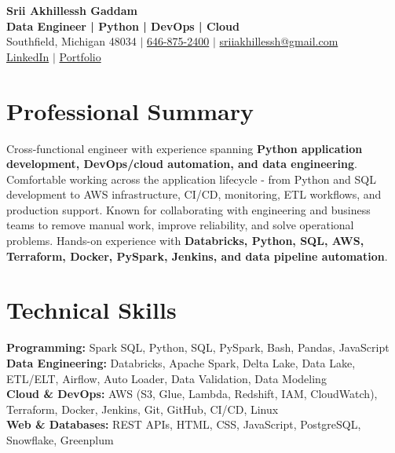 \documentclass[letterpaper,10pt]{article}
\begin{document}
\fontsize{9.35pt}{10.45pt}\selectfont

\begin{center}
    {\LARGE \textbf{Srii Akhillessh Gaddam}} \\[-1pt]
    \textbf{Data Engineer | Python | DevOps | Cloud} \\[2pt]
    Southfield, Michigan 48034 $|$
    \href{tel:6468752400}{646-875-2400} $|$
    \href{mailto:sriiakhillessh@gmail.com}{sriiakhillessh@gmail.com} \\[1pt]
    \href{https://www.linkedin.com/in/srii-akhiilessh-gaddam-b48668191/}{LinkedIn} $|$
    \href{https://sriiakhillesshg.github.io/portfolio/}{Portfolio}
\end{center}
\vspace{-8pt}

\section{Professional Summary}
\small{Cross-functional engineer with experience spanning \textbf{Python application development, DevOps/cloud automation, and data engineering}. Comfortable working across the application lifecycle - from Python and SQL development to AWS infrastructure, CI/CD, monitoring, ETL workflows, and production support. Known for collaborating with engineering and business teams to remove manual work, improve reliability, and solve operational problems. Hands-on experience with \textbf{Databricks, Python, SQL, AWS, Terraform, Docker, PySpark, Jenkins, and data pipeline automation}.}

\section{Technical Skills}
\small{
\textbf{Programming:} Spark SQL, Python, SQL, PySpark, Bash, Pandas, JavaScript \\
\textbf{Data Engineering:} Databricks, Apache Spark, Delta Lake, Data Lake, ETL/ELT, Airflow, Auto Loader, Data Validation, Data Modeling \\
\textbf{Cloud \& DevOps:} AWS (S3, Glue, Lambda, Redshift, IAM, CloudWatch), Terraform, Docker, Jenkins, Git, GitHub, CI/CD, Linux \\
\textbf{Web \& Databases:} REST APIs, HTML, CSS, JavaScript, PostgreSQL, Snowflake, Greenplum
}
\end{document}
